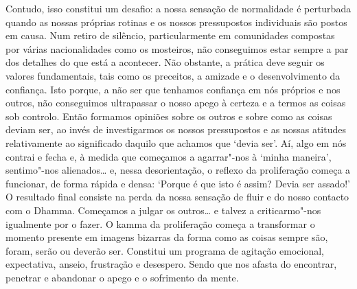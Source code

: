 Contudo, isso constitui um desafio: a nossa sensação de normalidade é perturbada quando as nossas próprias rotinas e os nossos pressupostos individuais são postos em causa. Num retiro de silêncio, particularmente em comunidades compostas por várias nacionalidades como os mosteiros, não conseguimos estar sempre a par dos detalhes do que está a acontecer. Não obstante, a prática deve seguir os valores fundamentais, tais como os preceitos, a amizade e o desenvolvimento da confiança. Isto porque, a não ser que tenhamos confiança em nós próprios e nos outros, não conseguimos ultrapassar o nosso apego à certeza e a termos as coisas sob controlo. Então formamos opiniões sobre os outros e sobre como as coisas deviam ser, ao invés de investigarmos os nossos pressupostos e as nossas atitudes relativamente ao significado daquilo que achamos que `devia ser'. Aí, algo em nós contrai e fecha e, à medida que começamos a agarrar"-nos à `minha maneira', sentimo"-nos alienados\ldots{} e, nessa desorientação, o reflexo da proliferação começa a funcionar, de forma rápida e densa: `Porque é que isto é assim? Devia ser assado!' O resultado final consiste na perda da nossa sensação de fluir e do nosso contacto com o Dhamma. Começamos a julgar os outros\ldots{} e talvez a criticarmo"-nos igualmente por o fazer. O kamma da proliferação começa a transformar o momento presente em imagens bizarras da forma como as coisas sempre são, foram, serão ou deverão ser. Constitui um programa de agitação emocional, expectativa, anseio, frustração e desespero. Sendo que nos afasta do encontrar, penetrar e abandonar o apego e o sofrimento da mente.

